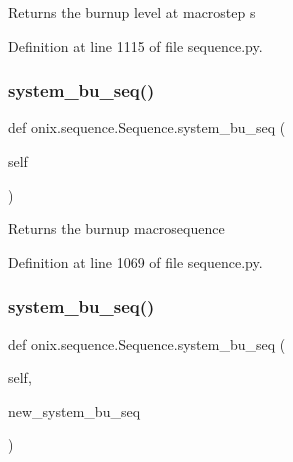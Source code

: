 \begin{DoxyVerb}Returns the burnup level at macrostep s\end{DoxyVerb}
 

Definition at line 1115 of file sequence.\+py.

\mbox{\label{classonix_1_1sequence_1_1Sequence_a43a37d2c202a4a5b912d7ada5c528e0e}} 
\subsubsection{\texorpdfstring{system\+\_\+bu\+\_\+seq()}{system\_bu\_seq()}\hspace{0.1cm}{\footnotesize\ttfamily [1/2]}}
{\footnotesize\ttfamily def onix.\+sequence.\+Sequence.\+system\+\_\+bu\+\_\+seq (\begin{DoxyParamCaption}\item[{}]{self }\end{DoxyParamCaption})}

\begin{DoxyVerb}Returns the burnup macrosequence
\end{DoxyVerb}
 

Definition at line 1069 of file sequence.\+py.

\mbox{\label{classonix_1_1sequence_1_1Sequence_af2f0256afee29b6ad9b07153f2bb7c81}} 
\subsubsection{\texorpdfstring{system\+\_\+bu\+\_\+seq()}{system\_bu\_seq()}\hspace{0.1cm}{\footnotesize\ttfamily [2/2]}}
{\footnotesize\ttfamily def onix.\+sequence.\+Sequence.\+system\+\_\+bu\+\_\+seq (\begin{DoxyParamCaption}\item[{}]{self,  }\item[{}]{new\+\_\+system\+\_\+bu\+\_\+seq }\end{DoxyParamCaption})}

